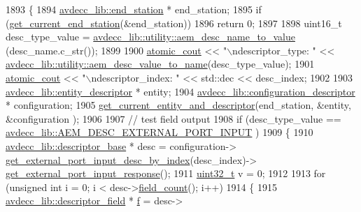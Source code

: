 \begin{DoxyCode}
1893 \{
1894     \hyperlink{classavdecc__lib_1_1end__station}{avdecc\_lib::end\_station} * end\_station;
1895     \textcolor{keywordflow}{if} (\hyperlink{classcmd__line_aa7ddf8d9fbcf5d1c6c5f329bc850418c}{get\_current\_end\_station}(&end\_station))
1896         \textcolor{keywordflow}{return} 0;
1897 
1898     uint16\_t desc\_type\_value = \hyperlink{namespaceavdecc__lib_1_1utility_a9f6076e32fa227555a95b6e95ea1e29b}{avdecc\_lib::utility::aem\_desc\_name\_to\_value}
      (desc\_name.c\_str());
1899 
1900     \hyperlink{cmd__line_8h_a0bc38ccc65c79ba06c6fcd7b4bf554c3}{atomic\_cout} << \textcolor{stringliteral}{"\(\backslash\)ndescriptor\_type: "} << 
      \hyperlink{namespaceavdecc__lib_1_1utility_a6bdd02679e5a911a071d4aa03be341f0}{avdecc\_lib::utility::aem\_desc\_value\_to\_name}(desc\_type\_value);
1901     \hyperlink{cmd__line_8h_a0bc38ccc65c79ba06c6fcd7b4bf554c3}{atomic\_cout} << \textcolor{stringliteral}{"\(\backslash\)ndescriptor\_index: "} << std::dec << desc\_index;
1902 
1903     \hyperlink{classavdecc__lib_1_1entity__descriptor}{avdecc\_lib::entity\_descriptor} * entity;
1904     \hyperlink{classavdecc__lib_1_1configuration__descriptor}{avdecc\_lib::configuration\_descriptor} * configuration;
1905     \hyperlink{classcmd__line_aa22ed7f036749918eb875043f10060c9}{get\_current\_entity\_and\_descriptor}(end\_station, &entity, &configuration
      );
1906 
1907     \textcolor{comment}{// test field output}
1908     \textcolor{keywordflow}{if} (desc\_type\_value == \hyperlink{namespaceavdecc__lib_ac7b7d227e46bc72b63ee9e9aae15902fafd26fe044fb2548e13163acbfad1812c}{avdecc\_lib::AEM\_DESC\_EXTERNAL\_PORT\_INPUT}
      )
1909     \{
1910         \hyperlink{classavdecc__lib_1_1descriptor__base}{avdecc\_lib::descriptor\_base} * desc = configuration->
      \hyperlink{classavdecc__lib_1_1configuration__descriptor_a0ce53511b68efa1e6e992431faac667e}{get\_external\_port\_input\_desc\_by\_index}(desc\_index)->
      \hyperlink{classavdecc__lib_1_1external__port__input__descriptor_a9402343ba692ce790343f2b5cbcef0c7}{get\_external\_port\_input\_response}();
1911         \hyperlink{parse_8c_a6eb1e68cc391dd753bc8ce896dbb8315}{uint32\_t} v = 0;
1912 
1913         \textcolor{keywordflow}{for} (\textcolor{keywordtype}{unsigned} \textcolor{keywordtype}{int} i = 0; i < desc->\hyperlink{classavdecc__lib_1_1descriptor__base_ab1edf4996377ed957088a7b3b16aca7d}{field\_count}(); i++)
1914         \{
1915             \hyperlink{classavdecc__lib_1_1descriptor__field}{avdecc\_lib::descriptor\_field} * \hyperlink{_i_e_e_e754_plugin_test__c_8c_ac9a1bf077a6110a5f27b9bdd6030aa83}{f} = desc->

\end{DoxyCode}
